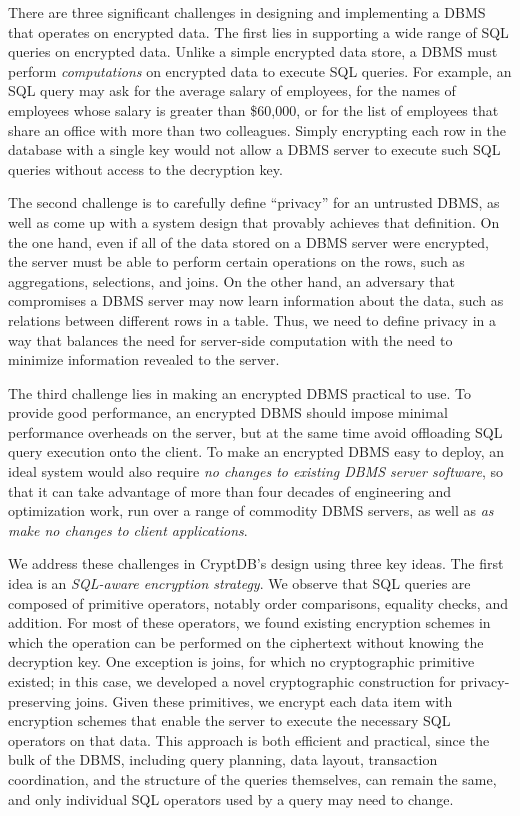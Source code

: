 There are three significant challenges in designing and implementing a
DBMS that operates on encrypted data.  The first lies in supporting a
wide range of SQL queries on encrypted data.  Unlike a simple
encrypted data store, a DBMS must perform {\em computations} on
encrypted data to execute SQL queries.  For example, an SQL query may
ask for the average salary of employees, for the names of employees
whose salary is greater than \$60,000, or for the list of employees
that share an office with more than two colleagues.  Simply encrypting
each row in the database with a single key would not allow a DBMS
server to execute such SQL queries without access to the decryption
key.

The second challenge is to carefully define ``privacy'' for an
untrusted DBMS, as well as come up with a system design that
provably achieves that definition.  On the one hand, even if all of
the data stored on a DBMS server were encrypted, the server must be
able to perform certain operations on the rows, such as aggregations,
selections, and joins.  On the other hand, an adversary that
compromises a DBMS server may now learn information about the data,
such as relations between different rows in a table.  Thus, we need to
define privacy in a way that balances the need for server-side
computation with the need to minimize information revealed to the
server.

The third challenge lies in making an encrypted DBMS practical to use.
To provide good performance, an encrypted DBMS should impose minimal
performance overheads on the server, but at the same time avoid
offloading SQL query execution onto the client.  To make an encrypted
DBMS easy to deploy, an ideal system would also require {\em no
  changes to existing DBMS server software}, so that it can take
advantage of more than four decades of engineering and
optimization work, run over a range of commodity DBMS servers, as well as
\textit{as make no changes to client applications}.

We address these challenges in CryptDB's design using three key
ideas.  The first idea is an {\em SQL-aware encryption strategy}.  We
observe that SQL queries are composed of primitive operators, notably
order comparisons, equality checks, and addition.  For most of these
operators, we found existing encryption schemes in which the operation
can be performed on the ciphertext without knowing the decryption key.
One exception is joins, for which no cryptographic primitive existed;
in this case, we developed a novel cryptographic construction for
privacy-preserving joins.
Given these primitives, we encrypt each
data item with encryption schemes that enable the server to execute
the necessary SQL operators on that data.  This approach is both
efficient and practical, since the bulk of the DBMS, including query
planning, data layout, transaction coordination, and the structure of
the queries themselves, can remain the same, and only individual
SQL operators used by a query may need to change.

